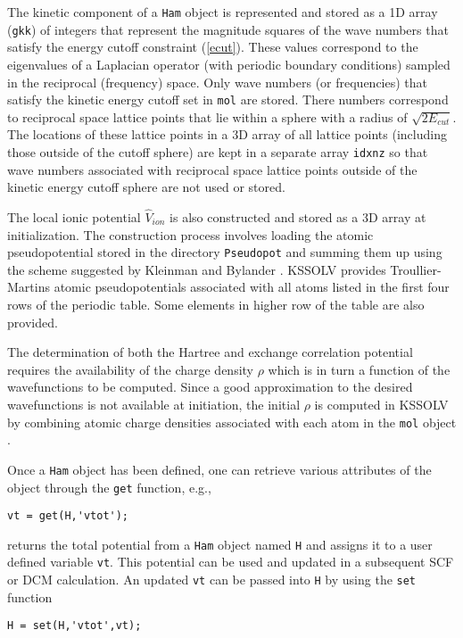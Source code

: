 \documentclass[11pt]{book}
\begin{document}
The kinetic component of a {\tt Ham} object is represented and stored 
as a 1D array ({\tt gkk}) of integers that represent the magnitude squares 
of the wave numbers that satisfy the energy cutoff constraint (\ref{ecut}). 
These values correspond to the eigenvalues of a Laplacian 
operator (with periodic boundary conditions) sampled in the reciprocal
(frequency) space. Only wave numbers (or frequencies)
that satisfy the kinetic energy cutoff set in {\tt mol} are stored.
There numbers correspond to reciprocal space lattice points that lie 
within a sphere with a radius of $\sqrt{2E_{cut}}$.
The locations of these lattice points in a 3D array of all lattice
points (including those outside of the cutoff sphere) are kept 
in a separate array {\tt idxnz} so that wave numbers associated with
reciprocal space lattice points outside of the kinetic energy cutoff sphere
are not used or stored.

The local ionic potential $\hat{V}_{ion}$ is also constructed and stored 
as a 3D array at initialization.  The construction process involves
loading the atomic pseudopotential stored in the directory {\tt Pseudopot} 
and summing them up using the scheme suggested by Kleinman and Bylander 
\cite{kbpseudo}.  KSSOLV provides Troullier-Martins \cite{tmpseudo} atomic 
pseudopotentials associated with all atoms listed in the first four
rows of the periodic table. Some elements in higher row of the
table are also provided.

The determination of both the Hartree and exchange correlation
potential requires the availability of the charge density $\rho$
which is in turn a function of the wavefunctions to be computed.
Since a good approximation to the desired wavefunctions is not available
at initiation, the initial $\rho$ is computed in KSSOLV by combining
atomic charge densities associated with each atom in the {\tt mol}
object \cite{kbpseudo}.

Once a {\tt Ham} object has been defined, one can retrieve various
attributes of the object through the {\tt get} function, e.g.,
\begin{verbatim}
vt = get(H,'vtot');
\end{verbatim}
returns the total potential from a {\tt Ham} object named {\tt H}
and assigns it to a user defined variable {\tt vt}. This potential
can be used and updated in a subsequent SCF or DCM calculation. An updated
{\tt vt} can be passed into {\tt H} by using the {\tt set} function
\begin{verbatim}
H = set(H,'vtot',vt);
\end{verbatim}
\end{document}
